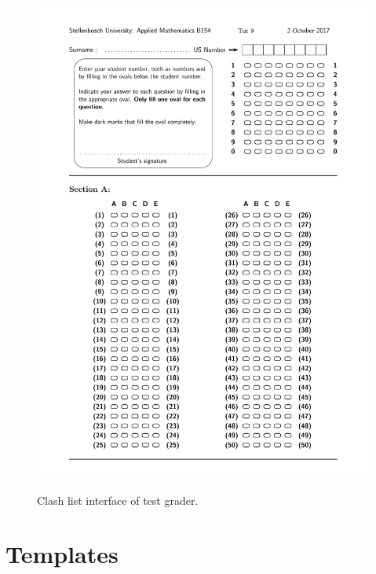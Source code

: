 \begin{figure}
  \centering
  \includegraphics[width=14cm]{clashInterface}\\
  \caption{Clash list interface of test grader.}
  \label{fig:clashInterface}
\end{figure}

\section{Templates}


